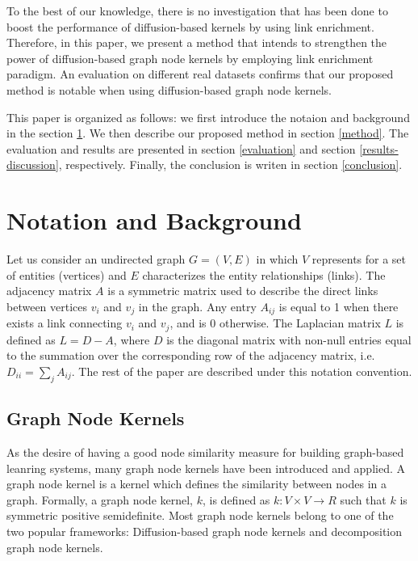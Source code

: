 \documentclass[runningheads,a4paper]{llncs}
\begin{document}
To the best of our knowledge, there is no investigation that has been done to boost the performance of diffusion-based kernels by using link enrichment. Therefore, in this paper, we present a method that intends to strengthen the power of diffusion-based graph node kernels by employing link enrichment paradigm. An evaluation on different real datasets confirms that our proposed method is notable when using diffusion-based graph node kernels.

This paper is organized as follows: we first introduce the notaion and background in the section \ref{background}. We then describe our proposed method in section \ref{method}. The evaluation and results are presented in section \ref{evaluation} and section \ref{results-discussion}, respectively. Finally, the conclusion is writen in section \ref{conclusion}.

\section{Notation and Background}
\label{background}
Let us consider an undirected graph $G = (V, E)$ in which $V$ represents for a set of entities (vertices)  and $E$ characterizes the entity relationships (links). The adjacency matrix $A$ is a symmetric matrix used to describe the direct links between vertices $v_{i}$ and $v_{j}$ in the graph. Any entry $A_{ij}$ is equal to 1 when there exists a link connecting $v_{i}$ and $v_{j}$, and is 0 otherwise. The Laplacian matrix $L$ is defined as $L = D-A$, where $D$ is the diagonal matrix with non-null entries equal to the summation over the corresponding row of the adjacency matrix, i.e. $D_{ii}=\sum_j A_{ij}$. The rest of the paper are described under this notation convention. 
\subsection{Graph Node Kernels}
As the desire of having a good node similarity measure for building graph-based leanring systems, many graph node kernels have been introduced and applied. A graph node kernel is a kernel which defines the similarity between nodes in a graph. Formally, a graph node kernel, $k$, is defined as $k: V \times V \longrightarrow R$ such that $k$ is symmetric positive semidefinite. Most graph node kernels belong to one of the two popular frameworks: Diffusion-based graph node kernels and decomposition graph node kernels. 
\end{document}
